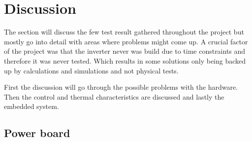 \section{Discussion}
\label{sec:discussion}

The section will discuss the few test result gathered throughout the project but mostly go into detail with areas where problems might come up.
A crucial factor of the project was that the inverter never was build due to time constraints and therefore it was never tested. Which results in some solutions only being backed up by calculations and simulations and not physical tests.


First the discussion will go through the possible problems with the hardware. Then the control and thermal characteristics are discussed and lastly the embedded system.









\subsection{Power board}
